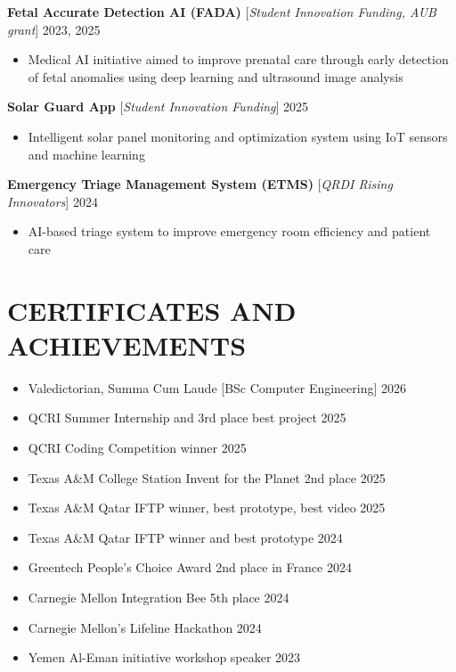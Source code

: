 \documentclass[11pt,a4paper]{article}
\begin{document}
\vspace{2pt}

\textbf{Fetal Accurate Detection AI (FADA)} [\textit{Student Innovation Funding, AUB grant}] \hfill 2023, 2025
\begin{itemize}[leftmargin=2em, nosep, label={}]
    \item Medical AI initiative aimed to improve prenatal care through early detection of fetal anomalies using deep learning and ultrasound image analysis
\end{itemize}

\vspace{2pt}

\textbf{Solar Guard App} [\textit{Student Innovation Funding}] \hfill 2025
\begin{itemize}[leftmargin=2em, nosep, label={}]
    \item Intelligent solar panel monitoring and optimization system using IoT sensors and machine learning
\end{itemize}

\vspace{2pt}

\textbf{Emergency Triage Management System (ETMS)} [\textit{QRDI Rising Innovators}] \hfill 2024
\begin{itemize}[leftmargin=2em, nosep, label={}]
    \item AI-based triage system to improve emergency room efficiency and patient care
\end{itemize}

\section*{CERTIFICATES AND ACHIEVEMENTS}
\begin{itemize}[leftmargin=0em, nosep, label={}]
    \item Valedictorian, Summa Cum Laude [BSc Computer Engineering] \hfill 2026
    \item QCRI Summer Internship and 3rd place best project \hfill 2025
    \item QCRI Coding Competition winner \hfill 2025
    \item Texas A\&M College Station Invent for the Planet 2nd place \hfill 2025
    \item Texas A\&M Qatar IFTP winner, best prototype, best video \hfill 2025
    \item Texas A\&M Qatar IFTP winner and best prototype \hfill 2024
    \item Greentech People's Choice Award 2nd place in France \hfill 2024
    \item Carnegie Mellon Integration Bee 5th place \hfill 2024
    \item Carnegie Mellon's Lifeline Hackathon \hfill 2024
    \item Yemen Al-Eman initiative workshop speaker \hfill 2023
\end{itemize}
\end{document}

